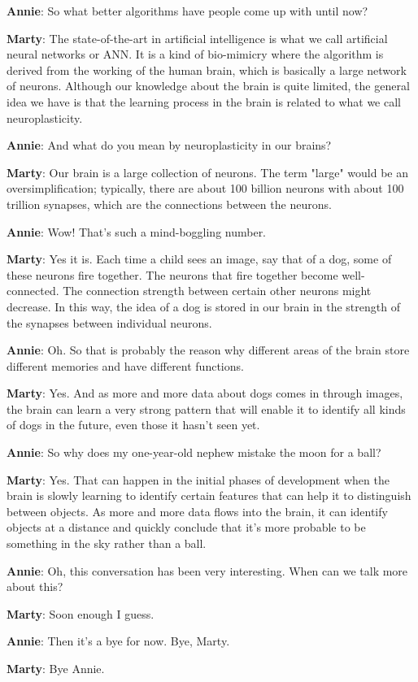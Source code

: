 \documentclass{../template/texnote}
\begin{document}
\textbf{Annie}: So what better algorithms have people come up with until now?

\textbf{Marty}: The state-of-the-art in artificial intelligence is what we call artificial neural networks or ANN. It is a kind of bio-mimicry where the algorithm is derived from the working of the human brain, which is basically a large network of neurons. Although our knowledge about the brain is quite limited, the general idea we have is that the learning process in the brain is related to what we call neuroplasticity. 

\textbf{Annie}: And what do you mean by neuroplasticity in our brains?

\textbf{Marty}: Our brain is a large collection of neurons. The term "large" would be an oversimplification; typically, there are about 100 billion neurons with about 100 trillion synapses, which are the connections between the neurons.

\textbf{Annie}: Wow! That's such a mind-boggling number.

\textbf{Marty}: Yes it is. Each time a child sees an image, say that of a dog, some of these neurons fire together. The neurons that fire together become well-connected. The connection strength between certain other neurons might decrease. In this way, the idea of a dog is stored in our brain in the strength of the synapses between individual neurons. 

\textbf{Annie}: Oh. So that is probably the reason why different areas of the brain store different memories and have different functions. 

\textbf{Marty}: Yes. And as more and more data about dogs comes in through images, the brain can learn a very strong pattern that will enable it to identify all kinds of dogs in the future, even those it hasn't seen yet. 

\textbf{Annie}: So why does my one-year-old nephew mistake the moon for a ball?

\textbf{Marty}: Yes. That can happen in the initial phases of development when the brain is slowly learning to identify certain features that can help it to distinguish between objects. As more and more data flows into the brain, it can identify objects at a distance and quickly conclude that it's more probable to be something in the sky rather than a ball. 

\textbf{Annie}: Oh, this conversation has been very interesting. When can we talk more about this?

\textbf{Marty}: Soon enough I guess. 

\textbf{Annie}: Then it's a bye for now. Bye, Marty. 

\textbf{Marty}: Bye Annie. 
    \printbibliography
\end{document}
